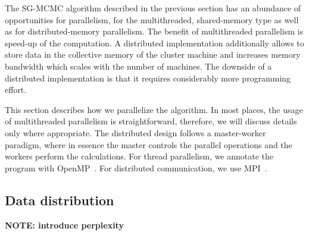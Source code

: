 \begin{comment}
- pi storage: DKV
   . pi/phi is read in 3), 4), 5a), 7)
   . pi is written in 4); read[i], then write[i], so no other data dependencies
   . so access is very synchronous: either read-only, or write without
     concurrent readers
   . DKV store properties:
      - single-sized keys
      - contiguous key space (integers 0..N-1)
      - update-only writes: no new KVs, no deletes
     so: no load imbalance, no hashing that is worth its name
      - no read/write or write/write concurrency
     so:
      - build RDMA store with remote reads and remote writes only, with exactly
        one RDMA transaction per read or write
\end{comment}



The SG-MCMC algorithm described in the previous section has an abundance of
opportunities for parallelism, for the multithreaded, shared-memory type as
well as for distributed-memory parallelism. The benefit of multithreaded
parallelism is speed-up of the computation. A distributed implementation
additionally allows to store data in the collective memory of the cluster
machine and increases memory bandwidth which scales with the number of
machines. The downside of a distributed implementation is that it requires
considerably more programming effort.


This section describes how we parallelize the algorithm.
In most places, the usage of multithreaded parallelism
is straightforward, therefore, we will discuss details only where appropriate. The
distributed design follows a master-worker paradigm, where in essence
the master controls the parallel operations and the workers perform the
calculations. For thread parallelism, we annotate the program with
OpenMP~\cite{OpenMPSpec}. For distributed communication, we use
MPI~\cite{Forum:1994:MMI:898758}.


\subsection{Data distribution}

{\Large\bf NOTE: introduce perplexity}

